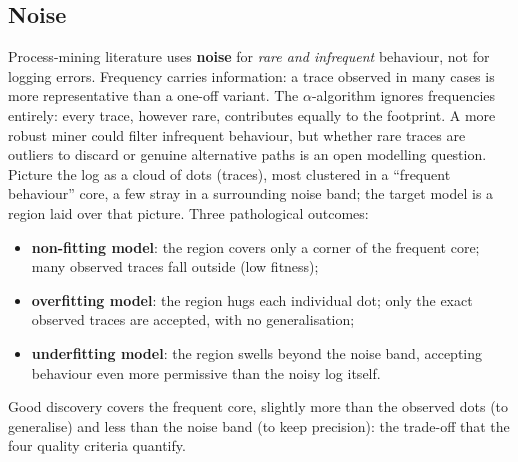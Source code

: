 \subsection{Noise}

Process-mining literature uses \textbf{noise} for \emph{rare and infrequent} behaviour, not for logging errors. Frequency carries information: a trace observed in many cases is more representative than a one-off variant. The $\alpha$-algorithm ignores frequencies entirely: every trace, however rare, contributes equally to the footprint. A more robust miner could filter infrequent behaviour, but whether rare traces are outliers to discard or genuine alternative paths is an open modelling question. Picture the log as a cloud of dots (traces), most clustered in a ``frequent behaviour'' core, a few stray in a surrounding noise band; the target model is a region laid over that picture. Three pathological outcomes:
\begin{itemize}
  \item \textbf{non-fitting model}: the region covers only a corner of the frequent core; many observed traces fall outside (low fitness);
  \item \textbf{overfitting model}: the region hugs each individual dot; only the exact observed traces are accepted, with no generalisation;
  \item \textbf{underfitting model}: the region swells beyond the noise band, accepting behaviour even more permissive than the noisy log itself.
\end{itemize}
Good discovery covers the frequent core, slightly more than the observed dots (to generalise) and less than the noise band (to keep precision): the trade-off that the four quality criteria quantify.

